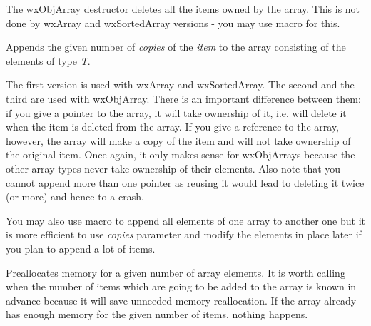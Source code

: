 \label{wxarraydtor}




The wxObjArray destructor deletes all the items owned by the array. This is not
done by wxArray and wxSortedArray versions - you may use
 macro for this.

\label{wxarrayadd}




Appends the given number of {\it copies} of the {\it item} to the array
consisting of the elements of type {\it T}.

The first version is used with wxArray and wxSortedArray. The second and the
third are used with wxObjArray. There is an important difference between
them: if you give a pointer to the array, it will take ownership of it, i.e.
will delete it when the item is deleted from the array. If you give a reference
to the array, however, the array will make a copy of the item and will not take
ownership of the original item. Once again, it only makes sense for wxObjArrays
because the other array types never take ownership of their elements. Also note
that you cannot append more than one pointer as reusing it would lead to
deleting it twice (or more) and hence to a crash.

You may also use  macro to append all
elements of one array to another one but it is more efficient to use
{\it copies} parameter and modify the elements in place later if you plan to
append a lot of items.

\label{wxarrayalloc}


Preallocates memory for a given number of array elements. It is worth calling
when the number of items which are going to be added to the array is known in
advance because it will save unneeded memory reallocation. If the array already
has enough memory for the given number of items, nothing happens.


